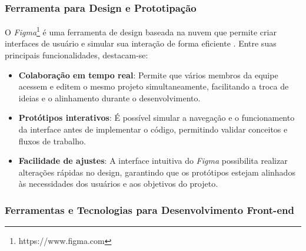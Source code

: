 \subsubsection{Ferramenta para Design e Prototipação}

O \textit{Figma}\footnote{https://www.figma.com} é uma ferramenta de design baseada na nuvem que permite criar interfaces de usuário e simular sua interação de forma eficiente \cite{Figma2025}. Entre suas principais funcionalidades, destacam-se:

\begin{itemize}
    \item \textbf{Colaboração em tempo real}: Permite que vários membros da equipe acessem e editem o mesmo projeto simultaneamente, facilitando a troca de ideias e o alinhamento durante o desenvolvimento.
    \item \textbf{Protótipos interativos}: É possível simular a navegação e o funcionamento da interface antes de implementar o código, permitindo validar conceitos e fluxos de trabalho.
    \item \textbf{Facilidade de ajustes}: A interface intuitiva do \textit{Figma} possibilita realizar alterações rápidas no design, garantindo que os protótipos estejam alinhados às necessidades dos usuários e aos objetivos do projeto.
\end{itemize}

\subsubsection{Ferramentas e Tecnologias para Desenvolvimento Front-end}

